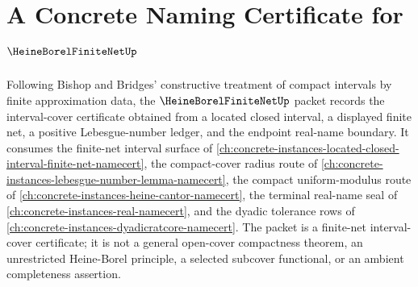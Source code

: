 \chapter{A Concrete Naming Certificate for $\HeineBorelFiniteNetUp$}
\label{ch:concrete-instances-heine-borel-finite-net-namecert}

Following Bishop and Bridges' constructive treatment of compact intervals by finite approximation data, the $\HeineBorelFiniteNetUp$ packet records the interval-cover certificate obtained from a located closed interval, a displayed finite net, a positive Lebesgue-number ledger, and the endpoint real-name boundary. It consumes the finite-net interval surface of \autoref{ch:concrete-instances-located-closed-interval-finite-net-namecert}, the compact-cover radius route of \autoref{ch:concrete-instances-lebesgue-number-lemma-namecert}, the compact uniform-modulus route of \autoref{ch:concrete-instances-heine-cantor-namecert}, the terminal real-name seal of \autoref{ch:concrete-instances-real-namecert}, and the dyadic tolerance rows of \autoref{ch:concrete-instances-dyadicratcore-namecert}. The packet is a finite-net interval-cover certificate; it is not a general open-cover compactness theorem, an unrestricted Heine-Borel principle, a selected subcover functional, or an ambient completeness assertion.

